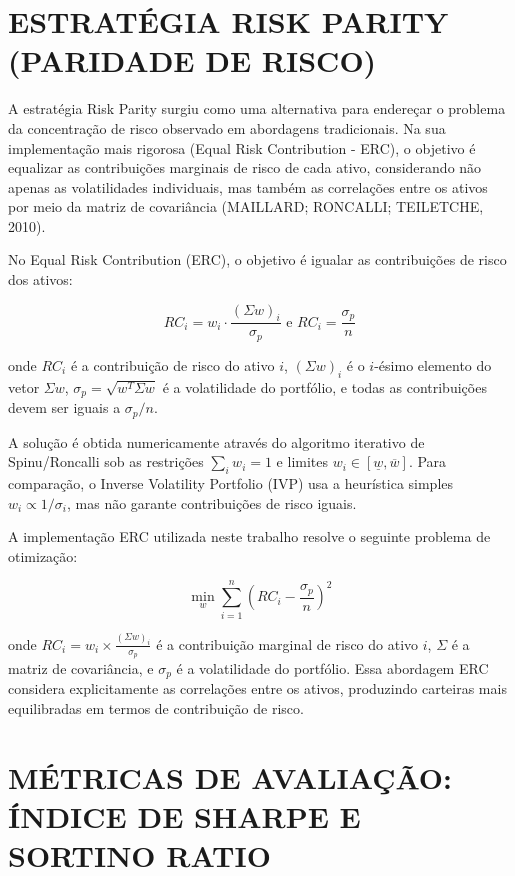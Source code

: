 \section{ESTRATÉGIA RISK PARITY (PARIDADE DE RISCO)}

A estratégia Risk Parity surgiu como uma alternativa para endereçar o problema da concentração de risco observado em abordagens tradicionais. Na sua implementação mais rigorosa (Equal Risk Contribution - ERC), o objetivo é equalizar as contribuições marginais de risco de cada ativo, considerando não apenas as volatilidades individuais, mas também as correlações entre os ativos por meio da matriz de covariância (MAILLARD; RONCALLI; TEILETCHE, 2010).

No Equal Risk Contribution (ERC), o objetivo é igualar as contribuições de risco dos ativos:

\begin{equation}
\label{eq:risk_parity}
RC_i = w_i \cdot \frac{(\Sigma w)_i}{\sigma_p} \text{ e } RC_i = \frac{\sigma_p}{n}
\end{equation}

onde $RC_i$ é a contribuição de risco do ativo $i$, $(\Sigma w)_i$ é o $i$-ésimo elemento do vetor $\Sigma w$, $\sigma_p = \sqrt{w^T \Sigma w}$ é a volatilidade do portfólio, e todas as contribuições devem ser iguais a $\sigma_p/n$.

A solução é obtida numericamente através do algoritmo iterativo de Spinu/Roncalli sob as restrições $\sum_i w_i = 1$ e limites $w_i \in [\underline{w}, \overline{w}]$. Para comparação, o Inverse Volatility Portfolio (IVP) usa a heurística simples $w_i \propto 1/\sigma_i$, mas não garante contribuições de risco iguais.

A implementação ERC utilizada neste trabalho resolve o seguinte problema de otimização:

\begin{equation}
\label{eq:erc_optimization}
\min_{w} \sum_{i=1}^{n} \left( RC_i - \frac{\sigma_p}{n} \right)^2
\end{equation}

onde $RC_i = w_i \times \frac{(\Sigma w)_i}{\sigma_p}$ é a contribuição marginal de risco do ativo $i$, $\Sigma$ é a matriz de covariância, e $\sigma_p$ é a volatilidade do portfólio. Essa abordagem ERC considera explicitamente as correlações entre os ativos, produzindo carteiras mais equilibradas em termos de contribuição de risco.

\section{MÉTRICAS DE AVALIAÇÃO: ÍNDICE DE SHARPE E SORTINO RATIO}

